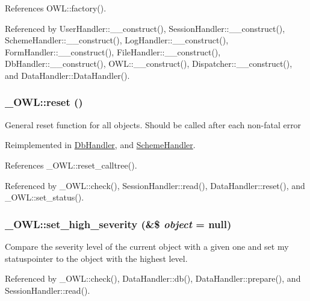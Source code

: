 References OWL::factory().



Referenced by UserHandler::\_\-\_\-construct(), SessionHandler::\_\-\_\-construct(), SchemeHandler::\_\-\_\-construct(), LogHandler::\_\-\_\-construct(), FormHandler::\_\-\_\-construct(), FileHandler::\_\-\_\-construct(), DbHandler::\_\-\_\-construct(), OWL::\_\-\_\-construct(), Dispatcher::\_\-\_\-construct(), and DataHandler::DataHandler().

\subsubsection[{reset}]{\setlength{\rightskip}{0pt plus 5cm}\_\-OWL::reset ()}\label{class__OWL_a2f2a042bcf31965194c03033df0edc9b}
General reset function for all objects. Should be called after each non-\/fatal error 

Reimplemented in \hyperlink{classDbHandler_a9982df4830f05803935bb31bac7fae3d}{DbHandler}, and \hyperlink{classSchemeHandler_aa25feb4a70d67b3d571904be4b2f50bc}{SchemeHandler}.



References \_\-OWL::reset\_\-calltree().



Referenced by \_\-OWL::check(), SessionHandler::read(), DataHandler::reset(), and \_\-OWL::set\_\-status().

\subsubsection[{set\_\-high\_\-severity}]{\setlength{\rightskip}{0pt plus 5cm}\_\-OWL::set\_\-high\_\-severity (\&\$ {\em object} = {\ttfamily null})}\label{class__OWL_a576829692a3b66e3d518853bf43abae3}
Compare the severity level of the current object with a given one and set my statuspointer to the object with the highest level. 

Referenced by \_\-OWL::check(), DataHandler::db(), DataHandler::prepare(), and SessionHandler::read().

